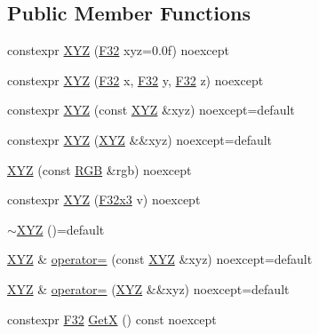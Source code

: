\subsection*{Public Member Functions}
\begin{DoxyCompactItemize}
\item 
constexpr \mbox{\hyperlink{structmage_1_1_x_y_z_af8b9ef53daa7463097c6397644a24ebf}{X\+YZ}} (\mbox{\hyperlink{namespacemage_aa97e833b45f06d60a0a9c4fc22ae02c0}{F32}} xyz=0.\+0f) noexcept
\item 
constexpr \mbox{\hyperlink{structmage_1_1_x_y_z_af1a6e6dd912ef8513640bd7a45af01d5}{X\+YZ}} (\mbox{\hyperlink{namespacemage_aa97e833b45f06d60a0a9c4fc22ae02c0}{F32}} x, \mbox{\hyperlink{namespacemage_aa97e833b45f06d60a0a9c4fc22ae02c0}{F32}} y, \mbox{\hyperlink{namespacemage_aa97e833b45f06d60a0a9c4fc22ae02c0}{F32}} z) noexcept
\item 
constexpr \mbox{\hyperlink{structmage_1_1_x_y_z_a340b36d0ef87c20f3ff4123e71fb6894}{X\+YZ}} (const \mbox{\hyperlink{structmage_1_1_x_y_z}{X\+YZ}} \&xyz) noexcept=default
\item 
constexpr \mbox{\hyperlink{structmage_1_1_x_y_z_abfabc56fbe50948bc3d894178685453a}{X\+YZ}} (\mbox{\hyperlink{structmage_1_1_x_y_z}{X\+YZ}} \&\&xyz) noexcept=default
\item 
\mbox{\hyperlink{structmage_1_1_x_y_z_a7502d9fa2f8d6bf59d00bcdb45c4fcd0}{X\+YZ}} (const \mbox{\hyperlink{structmage_1_1_r_g_b}{R\+GB}} \&rgb) noexcept
\item 
constexpr \mbox{\hyperlink{structmage_1_1_x_y_z_af2edf71f76a8c7d457229adaf904fb07}{X\+YZ}} (\mbox{\hyperlink{namespacemage_a1e3c7a882af461f161caa1cbddaf1fa2}{F32x3}} v) noexcept
\item 
\mbox{\hyperlink{structmage_1_1_x_y_z_a07eb7ce1ad3308774b0bbad3a7f121ce}{$\sim$\+X\+YZ}} ()=default
\item 
\mbox{\hyperlink{structmage_1_1_x_y_z}{X\+YZ}} \& \mbox{\hyperlink{structmage_1_1_x_y_z_a817c69124934fa9ad5d7d63b5696c939}{operator=}} (const \mbox{\hyperlink{structmage_1_1_x_y_z}{X\+YZ}} \&xyz) noexcept=default
\item 
\mbox{\hyperlink{structmage_1_1_x_y_z}{X\+YZ}} \& \mbox{\hyperlink{structmage_1_1_x_y_z_aa8b016328f6210e3b0b13cff7087dbee}{operator=}} (\mbox{\hyperlink{structmage_1_1_x_y_z}{X\+YZ}} \&\&xyz) noexcept=default
\item 
constexpr \mbox{\hyperlink{namespacemage_aa97e833b45f06d60a0a9c4fc22ae02c0}{F32}} \mbox{\hyperlink{structmage_1_1_x_y_z_ad11318d8920b1782b07c4ac30d4c0204}{GetX}} () const noexcept

\end{DoxyCompactItemize}
